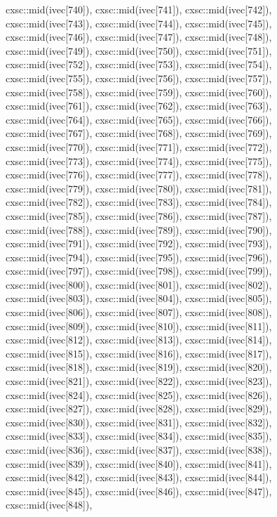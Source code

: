 \begin{DoxyCode}
{  cxsc::mid(ivec[740]),
  cxsc::mid(ivec[741]),
  cxsc::mid(ivec[742]),
  cxsc::mid(ivec[743]),
  cxsc::mid(ivec[744]),
  cxsc::mid(ivec[745]),
  cxsc::mid(ivec[746]),
  cxsc::mid(ivec[747]),
  cxsc::mid(ivec[748]),
  cxsc::mid(ivec[749]),
  cxsc::mid(ivec[750]),
  cxsc::mid(ivec[751]),
  cxsc::mid(ivec[752]),
  cxsc::mid(ivec[753]),
  cxsc::mid(ivec[754]),
  cxsc::mid(ivec[755]),
  cxsc::mid(ivec[756]),
  cxsc::mid(ivec[757]),
  cxsc::mid(ivec[758]),
  cxsc::mid(ivec[759]),
  cxsc::mid(ivec[760]),
  cxsc::mid(ivec[761]),
  cxsc::mid(ivec[762]),
  cxsc::mid(ivec[763]),
  cxsc::mid(ivec[764]),
  cxsc::mid(ivec[765]),
  cxsc::mid(ivec[766]),
  cxsc::mid(ivec[767]),
  cxsc::mid(ivec[768]),
  cxsc::mid(ivec[769]),
  cxsc::mid(ivec[770]),
  cxsc::mid(ivec[771]),
  cxsc::mid(ivec[772]),
  cxsc::mid(ivec[773]),
  cxsc::mid(ivec[774]),
  cxsc::mid(ivec[775]),
  cxsc::mid(ivec[776]),
  cxsc::mid(ivec[777]),
  cxsc::mid(ivec[778]),
  cxsc::mid(ivec[779]),
  cxsc::mid(ivec[780]),
  cxsc::mid(ivec[781]),
  cxsc::mid(ivec[782]),
  cxsc::mid(ivec[783]),
  cxsc::mid(ivec[784]),
  cxsc::mid(ivec[785]),
  cxsc::mid(ivec[786]),
  cxsc::mid(ivec[787]),
  cxsc::mid(ivec[788]),
  cxsc::mid(ivec[789]),
  cxsc::mid(ivec[790]),
  cxsc::mid(ivec[791]),
  cxsc::mid(ivec[792]),
  cxsc::mid(ivec[793]),
  cxsc::mid(ivec[794]),
  cxsc::mid(ivec[795]),
  cxsc::mid(ivec[796]),
  cxsc::mid(ivec[797]),
  cxsc::mid(ivec[798]),
  cxsc::mid(ivec[799]),
  cxsc::mid(ivec[800]),
  cxsc::mid(ivec[801]),
  cxsc::mid(ivec[802]),
  cxsc::mid(ivec[803]),
  cxsc::mid(ivec[804]),
  cxsc::mid(ivec[805]),
  cxsc::mid(ivec[806]),
  cxsc::mid(ivec[807]),
  cxsc::mid(ivec[808]),
  cxsc::mid(ivec[809]),
  cxsc::mid(ivec[810]),
  cxsc::mid(ivec[811]),
  cxsc::mid(ivec[812]),
  cxsc::mid(ivec[813]),
  cxsc::mid(ivec[814]),
  cxsc::mid(ivec[815]),
  cxsc::mid(ivec[816]),
  cxsc::mid(ivec[817]),
  cxsc::mid(ivec[818]),
  cxsc::mid(ivec[819]),
  cxsc::mid(ivec[820]),
  cxsc::mid(ivec[821]),
  cxsc::mid(ivec[822]),
  cxsc::mid(ivec[823]),
  cxsc::mid(ivec[824]),
  cxsc::mid(ivec[825]),
  cxsc::mid(ivec[826]),
  cxsc::mid(ivec[827]),
  cxsc::mid(ivec[828]),
  cxsc::mid(ivec[829]),
  cxsc::mid(ivec[830]),
  cxsc::mid(ivec[831]),
  cxsc::mid(ivec[832]),
  cxsc::mid(ivec[833]),
  cxsc::mid(ivec[834]),
  cxsc::mid(ivec[835]),
  cxsc::mid(ivec[836]),
  cxsc::mid(ivec[837]),
  cxsc::mid(ivec[838]),
  cxsc::mid(ivec[839]),
  cxsc::mid(ivec[840]),
  cxsc::mid(ivec[841]),
  cxsc::mid(ivec[842]),
  cxsc::mid(ivec[843]),
  cxsc::mid(ivec[844]),
  cxsc::mid(ivec[845]),
  cxsc::mid(ivec[846]),
  cxsc::mid(ivec[847]),
  cxsc::mid(ivec[848]),
}
\end{DoxyCode}
